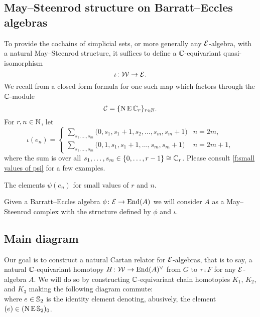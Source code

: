 \subsection{May--Steenrod structure on Barratt--Eccles algebras}\label{ss:may-steenrod on barratt-eccles}

To provide the cochains of simplicial sets, or more generally any $\mathcal{E}$-algebra, with a natural May--Steenrod structure, it suffices to define a $\mathbb{C}$-equivariant quasi-isomorphism
\[
\iota \colon \mathcal{W} \to \mathcal{E}.
\]
We recall from \cite{medina2021may_st} a closed form formula for one such map which factors through the $\mathbb{C}$-module
\[
\mathcal{C} = \{\operatorname{N}\operatorname{E}\mathbb{C}_r\}_{r\in\mathbb{N}}.
\]
For $r,n\in\mathbb{N}$, let
\begin{equation*}
	\iota(e_{n}) =
	\begin{cases}
		\displaystyle{\sum_{s_1, \dots, s_m}} \big(0, {s_1}, {s_1+1}, {s_2}, \dots, {s_{m}}, {s_{m}+1} \big) & n = 2m, \\
		\displaystyle{\sum_{s_1, \dots, s_m}} \big(0, 1, {s_1}, {s_1+1}, \dots, {s_{m}}, {s_{m}+1} \big) & n = 2m+1,
	\end{cases}
\end{equation*}
where the sum is over all $s_1, \dots, s_m \in \{0, \dots, r-1\} \cong \mathbb{C}_r$.
Please consult \cref{f:small values of psi} for a few examples.

\begin{table}
	\centering
	
	\caption{The elements $\psi(e_n)$ for small values of $r$ and $n$.}
	\label{f:small values of psi}
\end{table}

Given a Barratt--Eccles algebra $\phi \colon \mathcal{E} \to \mathrm{End}(A)$ we will consider $A$ as a May--Steenrod complex with the structure defined by $\phi$ and $\iota$.

\subsection{Main diagram}

Our goal is to construct a natural Cartan relator for $\mathcal{E}$-algebras, that is to say, a natural $\mathbb{C}$-equivariant homotopy $H \colon \mathcal{W} \to \mathrm{End}(A)^\vee$ from $G$ to $\tau \comp F$ for any $\mathcal{E}$-algebra $A$.
We will do so by constructing $\mathbb{C}$-equivariant chain homotopies $K_1$, $K_2$, and $K_3$ making the following diagram commute:
\begin{equation}\label{d:big diagram}
	
\end{equation}
where $e \in \mathbb{S}_2$ is the identity element denoting, abusively, the element $(e) \in (\operatorname{N}\operatorname{E}\mathbb{S}_2)_0$.


